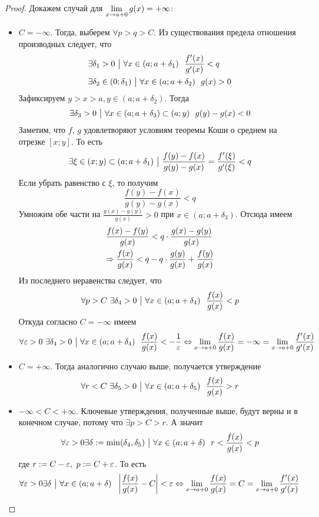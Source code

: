 \begin{proof}
	Докажем случай для $\lim\limits_{x \to a + 0} g(x) = +\infty$:
	\begin{itemize}
		\item $C = -\infty$. Тогда, выберем $\forall p > q > C$. Из существования предела отношения производных следует, что
		\begin{align*}
			&\exists \delta_1 > 0 \ \big|\  \forall x \in (a; a + \delta_1)\ \ \frac{f'(x)}{g'(x)} < q
			\\
			&\exists \delta_2 \in (0; \delta_1) \ \big|\  \forall x \in (a; a + \delta_2)\ \ g(x) > 0
		\end{align*}
		Зафиксируем $y > x > a, y \in (a; a + \delta_2)$. Тогда
		\[
			\exists \delta_3 > 0 \ \big|\  \forall x \in (a; a + \delta_3) \subset (a; y)\ \ g(y) - g(x) < 0
		\]
		Заметим, что $f$, $g$ удовлетворяют условиям теоремы Коши о среднем на отрезке $[x; y]$. То есть
		\[
			\exists \xi \in (x; y) \subset (a; a + \delta_1) \ \big|\  \frac{f(y) - f(x)}{g(y) - g(x)} = \frac{f'(\xi)}{g'(\xi)} < q
		\]
		Если убрать равенство с $\xi$, то получим
		\[
			\frac{f(y) - f(x)}{g(y) - g(x)} < q
		\]
		Умножим обе части на $\frac{g(x) - g(y)}{g(x)} > 0$ при $x \in (a; a + \delta_3)$. Отсюда имеем
		\begin{align*}
			&{\frac{f(x) - f(y)}{g(x)} < q \cdot \frac{g(x) - g(y)}{g(x)}}
			\\
			&{\Rightarrow \frac{f(x)}{g(x)} < q - q \cdot \frac{g(y)}{g(x)} + \frac{f(y)}{g(x)}}
		\end{align*}
		Из последнего неравенства следует, что
		\[
			\forall p > C\ \exists \delta_4 > 0 \ \big|\  \forall x \in (a; a + \delta_4)\ \ \frac{f(x)}{g(x)} < p
		\]
		Откуда согласно $C = -\infty$ имеем
		\[
			\forall \varepsilon > 0\ \exists \delta_4 > 0 \ \big|\  \forall x \in (a; a + \delta_4)\ \ \frac{f(x)}{g(x)} < -\frac{1}{\varepsilon} \Leftrightarrow \lim\limits_{x \to a + 0} \frac{f(x)}{g(x)} = -\infty = \lim\limits_{x \to a + 0} \frac{f'(x)}{g'(x)}
		\]
		
		\item $C = +\infty$. Тогда аналогично случаю выше, получается утверждение
		\[
			\forall r < C\ \exists \delta_5 > 0 \ \big|\  \forall x \in (a; a + \delta_5)\ \ \frac{f(x)}{g(x)} > r
		\]
		
		\item $-\infty < C < +\infty$. Ключевые утверждения, полученные выше, будут верны и в конечном случае, потому что $\exists p > C > r$. А значит
		\[
			\forall \varepsilon > 0 \exists \delta := \min(\delta_4, \delta_5) \ \big|\  \forall x \in (a; a + \delta)\ \ r < \frac{f(x)}{g(x)} < p
		\]
		где $r := C - \varepsilon,\ p := C + \varepsilon$. То есть
		\[
			\forall \varepsilon > 0 \exists \delta \ \big|\  \forall x \in (a; a + \delta)\ \ \left|\frac{f(x)}{g(x)} - C\right| < \varepsilon \Leftrightarrow \lim\limits_{x \to a + 0} \frac{f(x)}{g(x)} = C = \lim\limits_{x \to a + 0} \frac{f'(x)}{g'(x)}
		\]
	\end{itemize}
\end{proof}

